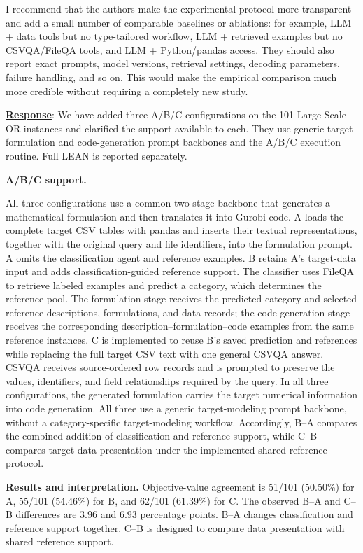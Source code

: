 \documentclass[11pt]{article}
\begin{document}
\begin{enumerate}[label=(R1.Major.\arabic*),leftmargin=*]
{I recommend that the authors make the experimental protocol more transparent and add a small number of comparable baselines or ablations: for example, LLM + data tools but no type-tailored workflow, LLM + retrieved examples but no CSVQA/FileQA tools, and LLM + Python/pandas access. They should also report exact prompts, model versions, retrieval settings, decoding parameters, failure handling, and so on. This would make the empirical comparison much more credible without requiring a completely new study.}\label{R1-major-4}


\noindent\underline{\textbf{Response}}:
We have added three A/B/C configurations on the 101 Large-Scale-OR instances and clarified the support available to each. They use generic target-formulation and code-generation prompt backbones and the A/B/C execution routine. Full LEAN is reported separately.

\textbf{A/B/C support.}

All three configurations use a common two-stage backbone that generates a mathematical formulation and then translates it into Gurobi code. A loads the complete target CSV tables with pandas and inserts their textual representations, together with the original query and file identifiers, into the formulation prompt. A omits the classification agent and reference examples. B retains A's target-data input and adds classification-guided reference support. The classifier uses FileQA to retrieve labeled examples and predict a category, which determines the reference pool. The formulation stage receives the predicted category and selected reference descriptions, formulations, and data records; the code-generation stage receives the corresponding description--formulation--code examples from the same reference instances. C is implemented to reuse B's saved prediction and references while replacing the full target CSV text with one general CSVQA answer. CSVQA receives source-ordered row records and is prompted to preserve the values, identifiers, and field relationships required by the query. In all three configurations, the generated formulation carries the target numerical information into code generation. All three use a generic target-modeling prompt backbone, without a category-specific target-modeling workflow. Accordingly, B--A compares the combined addition of classification and reference support, while C--B compares target-data presentation under the implemented shared-reference protocol.


\textbf{Results and interpretation.}
Objective-value agreement is 51/101 (50.50\%) for A, 55/101 (54.46\%) for B, and 62/101 (61.39\%) for C. The observed B--A and C--B differences are 3.96 and 6.93 percentage points. B--A changes classification and reference support together. C--B is designed to compare data presentation with shared reference support. 


\end{enumerate}
\end{document}
